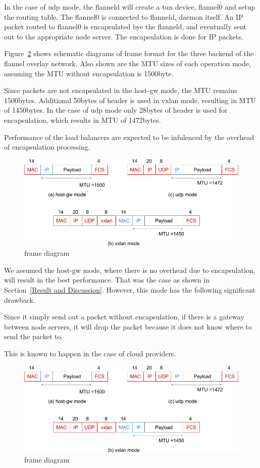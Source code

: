 In the case of udp mode, the flanneld will create a tun device, flannel0 and setup the routing table.
The flannel0 is connected to flanneld, daemon itself.
An IP packet routed to flannel0 is encapsulated bye the flanneld, and eventually sent out 
to the appropriate node server. 
The encapsulation is done for IP packets.

Figure~\ref{fig:flannel-packet-diagram} shows schematic diagrams of frame format for the three backend of 
the flannel overlay network.
Also shown are the MTU sizes of each operation mode, assuming the MTU without encapsulation is 1500byte.

Since packets are not encapsulated in the host-gw mode, the MTU remains 1500bytes.
Additional 50bytes of header is used in vxlan mode, resulting in MTU of 1450bytes.
In the case of udp mode only 28bytes of header is used for encapsulation, which results in MTU of 1472bytes.

Performance of the load balancers are expected to be infulenced by the overhead of encapsulation processing.

\begin{figure}
\includegraphics[width=\columnwidth]{Figs/flannel-packet-diagram}
\caption{frame diagram}
\label{fig:flannel-packet-diagram}
\end{figure}

We assumed the host-gw mode, where there is no overhead due to encapsulation, will result in the best performance.
That was the case as shown in Section~\ref{Result and Discussion}.
However, this mode has the following significant drawback.

Since it simply send out a packet without encapsulation, 
if there is a gateway between node servers, 
it will drop the packet because it does not know where to send the packet to.

This is known to happen in the case of cloud providers.  

\begin{figure}
\includegraphics[width=\columnwidth]{Figs/flannel-packet-diagram}
\caption{frame diagram}
\label{fig:flannel-packet-diagram}
\end{figure}


